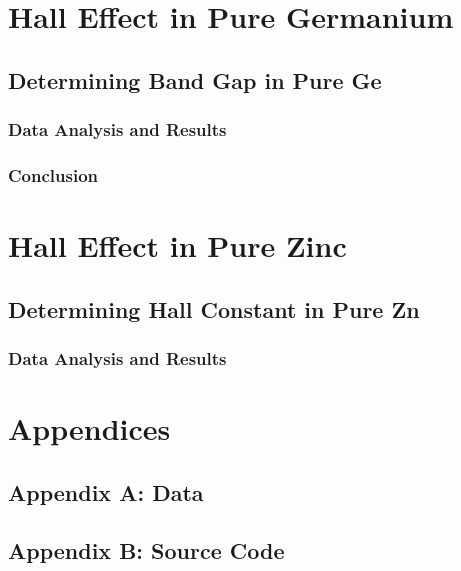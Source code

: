 \documentclass[a4paper]{article}
\begin{document}
\section{Hall Effect in Pure Germanium}

\subsection{Determining Band Gap in Pure Ge}

\subsubsection{Data Analysis and Results}

\subsubsection{Conclusion}

\section{Hall Effect in Pure Zinc}

\subsection{Determining Hall Constant in Pure Zn}

\subsubsection{Data Analysis and Results}

\section{Appendices}

\subsection{Appendix A: Data}

\subsection{Appendix B: Source Code}
\end{document}
